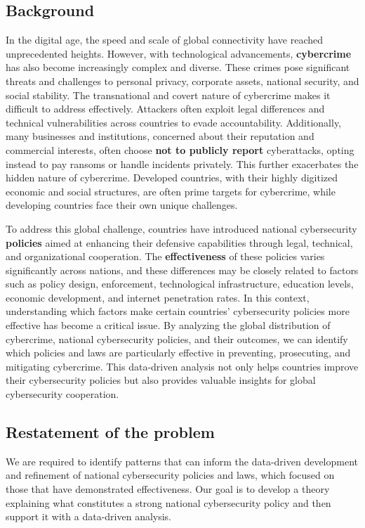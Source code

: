 
\subsection{Background}\label{subsec:background} %
	In the digital age, the speed and scale of global connectivity have reached unprecedented heights.
	However, with technological advancements, \textbf{cybercrime} has also become increasingly complex and diverse.
	These crimes pose significant threats and challenges to personal privacy, corporate assets, national security, and social stability.
	The transnational and covert nature of cybercrime makes it difficult to address effectively.
	Attackers often exploit legal differences and technical vulnerabilities across countries to evade accountability.
	Additionally, many businesses and institutions, concerned about their reputation and commercial interests,
	often choose \textbf{not to publicly report} cyberattacks, opting instead to pay ransoms or handle incidents privately.
	This further exacerbates the hidden nature of cybercrime.
	Developed countries, with their highly digitized economic and social structures, are often prime targets for cybercrime, while
	developing countries face their own unique challenges.

	To address this global challenge, countries have introduced national cybersecurity \textbf{policies}
	aimed at enhancing their defensive capabilities through legal, technical, and organizational cooperation.
	The \textbf{effectiveness} of these policies varies significantly across nations, and these differences may be closely related to factors
	such as policy design, enforcement, technological infrastructure, education levels, economic development, and internet penetration rates.
	In this context, understanding which factors make certain countries' cybersecurity policies more effective has become a critical issue.
	By analyzing the global distribution of cybercrime, national cybersecurity policies, and their outcomes,
	we can identify which policies and laws are particularly effective in preventing, prosecuting, and mitigating cybercrime.
	This data-driven analysis not only helps countries improve their cybersecurity policies
	but also provides valuable insights for global cybersecurity cooperation.
\subsection{Restatement of the problem}\label{subsec:restatement-of-the-problem} %
	We are required to identify patterns
	that can inform the data-driven development and refinement of national cybersecurity policies and laws,
	which focused on those that have demonstrated effectiveness.
	Our goal is to develop a theory explaining what constitutes a strong national cybersecurity policy and then
	support it with a data-driven analysis.

